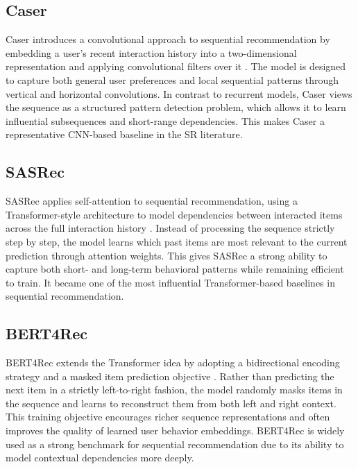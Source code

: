 \documentclass[12pt,a4paper]{report}
\begin{document}
\subsection{Caser}

\justifying
Caser introduces a convolutional approach to sequential recommendation by
embedding a user's recent interaction history into a two-dimensional
representation and applying convolutional filters over it \citep{tang2018caser}.
The model is designed to capture both general user preferences and local
sequential patterns through vertical and horizontal convolutions. In contrast to
recurrent models, Caser views the sequence as a structured pattern detection
problem, which allows it to learn influential subsequences and short-range
dependencies. This makes Caser a representative CNN-based baseline in the SR
literature.

\subsection{SASRec}

\justifying
SASRec applies self-attention to sequential recommendation, using a
Transformer-style architecture to model dependencies between interacted items
across the full interaction history \citep{kang2018sasrec}. Instead of
processing the sequence strictly step by step, the model learns which past items
are most relevant to the current prediction through attention weights. This gives
SASRec a strong ability to capture both short- and long-term behavioral patterns
while remaining efficient to train. It became one of the most influential
Transformer-based baselines in sequential recommendation.

\subsection{BERT4Rec}

\justifying
BERT4Rec extends the Transformer idea by adopting a bidirectional encoding
strategy and a masked item prediction objective \citep{sun2019bert4rec}. Rather
than predicting the next item in a strictly left-to-right fashion, the model
randomly masks items in the sequence and learns to reconstruct them from both
left and right context. This training objective encourages richer sequence
representations and often improves the quality of learned user behavior
embeddings. BERT4Rec is widely used as a strong benchmark for sequential
recommendation due to its ability to model contextual dependencies more deeply.
\end{document}
